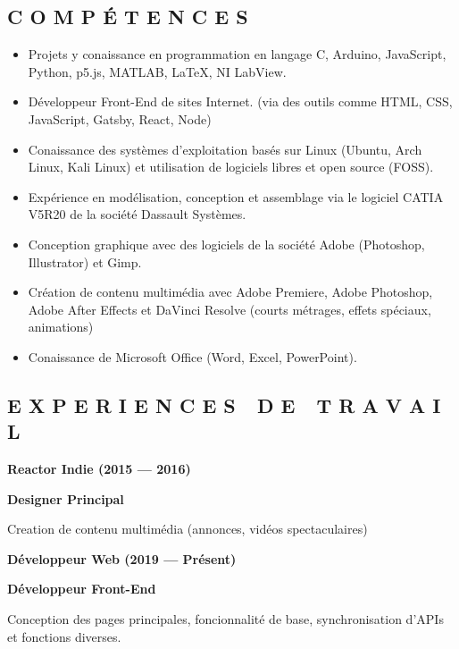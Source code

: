 \documentclass[12pt, letterpaper]{article}
\begin{document}
\begin{shaded}
	\vspace{-0.3cm}
	\subsection*{\textcolor{title}{C O M P É T E N C E S}}
	
	\begin{itemize}
		\item Projets y conaissance en programmation en langage C, Arduino, JavaScript, Python, p5.js, MATLAB, LaTeX, NI LabView.
		\item Développeur Front-End de sites Internet. (via des outils comme HTML, CSS, JavaScript, Gatsby, React, Node)
		\item Conaissance des systèmes d'exploitation basés sur Linux (Ubuntu, Arch Linux, Kali Linux) et utilisation de logiciels libres et open source (FOSS).
		\item Expérience en modélisation, conception et assemblage via le logiciel CATIA V5R20 de la société Dassault Systèmes.
		\item Conception graphique avec des logiciels de la société Adobe (Photoshop, Illustrator) et Gimp.
		\item Création de contenu multimédia avec Adobe Premiere, Adobe Photoshop, Adobe After Effects et DaVinci Resolve (courts métrages, effets spéciaux, animations)
		\item Conaissance de Microsoft Office (Word, Excel, PowerPoint).
	\end{itemize}
\end{shaded}


\subsection*{\textcolor{title}{E X P E R I E N C E S\ \ D E\ \ T R A V A I L}}

	\noindent \textbf{\textcolor{subtitle}{Reactor Indie (2015 --- 2016)}}
	
	\textbf{Designer Principal}

	Creation de contenu multimédia (annonces, vidéos spectaculaires)

	\noindent \textbf{\textcolor{subtitle}{Développeur  Web (2019 --- Présent)}}
	
	\textbf{Développeur Front-End}

	Conception des pages principales, foncionnalité de base, synchronisation d'APIs et fonctions diverses.

\renewcommand\refname{References}
\printbibliography
\end{document}
